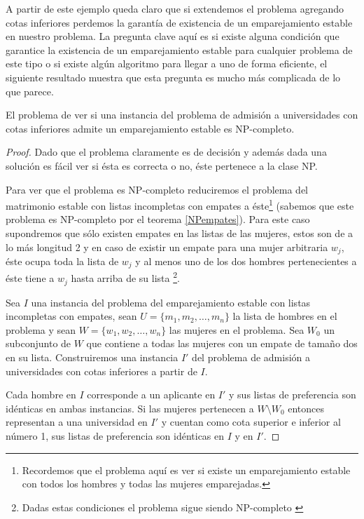 A partir de este ejemplo queda claro que si extendemos el problema agregando cotas inferiores perdemos la garantía de existencia de un emparejamiento estable en nuestro problema. La pregunta clave aquí es si existe alguna condición que garantice la existencia de un emparejamiento estable para cualquier problema de este tipo o si existe algún algoritmo para llegar a uno de forma eficiente, el siguiente resultado muestra que esta pregunta es mucho más complicada de lo que parece. 

\begin{teo} \cite{Todo}
\label{np1}
El problema de ver si una instancia del problema de admisión a universidades con cotas inferiores admite un emparejamiento estable es NP-completo. 
\end{teo}

\begin{proof}
Dado que el problema claramente es de decisión y además dada una solución es fácil ver si ésta es correcta o no, éste pertenece a la clase NP.

Para ver que el problema es NP-completo reduciremos el problema del matrimonio estable con listas incompletas con empates a éste\footnote{Recordemos que el problema aquí es ver si existe un emparejamiento estable con todos los hombres y todas las mujeres emparejadas.} (sabemos que este problema es NP-completo por el teorema \ref{NPempates}). Para este caso supondremos que sólo existen empates en las listas de las mujeres, estos son de a lo más longitud 2 y en caso de existir un empate para una mujer arbitraria $w_j$, éste ocupa toda la lista de $w_j$ y al menos uno de los dos hombres pertenecientes a éste tiene a $w_j$ hasta arriba de su lista \footnote{Dadas estas condiciones el problema sigue siendo NP-completo \cite{empates}}. 

Sea $I$ una instancia del problema del emparejamiento estable con listas incompletas con empates, sean $U=\{m_1,m_2,\dots,m_n\}$ la lista de hombres en el problema y sean $W=\{w_1,w_2,\dots,w_n\}$ las mujeres en el problema. Sea $W_0$ un subconjunto de $W$ que contiene a todas las mujeres con un empate de tamaño dos en su lista. Construiremos una instancia $I'$ del problema de admisión a universidades con cotas inferiores a partir de $I$. 

Cada hombre en $I$ corresponde a un aplicante en $I'$ y sus listas de preferencia son idénticas en ambas instancias. Si las mujeres pertenecen a $W \setminus W_0$ entonces representan a una universidad en $I'$ y cuentan como cota superior e inferior al número 1, sus listas de preferencia son idénticas en $I$ y en $I'$.


\end{proof}
